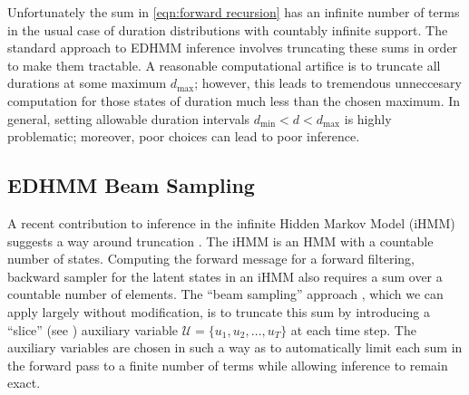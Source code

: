 Unfortunately the sum in \eqref{eqn:forward recursion} has an infinite number of terms in the usual case of  duration distributions with countably infinite support. The standard approach to EDHMM inference involves truncating these sums in order to make them tractable. 
A reasonable computational artifice is to truncate all durations at some maximum $d_\mathrm{max}$; however, this leads to tremendous unneccesary computation for those states of duration much less than the chosen maximum.
In general, setting allowable duration intervals $d_\mathrm{min}<d<d_\mathrm{max}$
is highly problematic; moreover, poor choices can lead to poor inference. 


\subsection{EDHMM Beam Sampling}

A recent contribution to inference 
in 
the infinite Hidden Markov Model (iHMM) \cite{Beal2002} suggests a way around truncation \cite{vanGael2008}.  The iHMM is an HMM with a countable number of states.  Computing the forward message for a forward filtering, backward sampler for the latent states in an iHMM also requires a sum over a countable number of elements.  
The ``beam sampling'' approach  \cite{vanGael2008}, which we can apply largely without modification, is to truncate this sum by introducing a ``slice''  (see \cite{Neal2003}) auxiliary variable $\mathcal{U} = \{u_1, u_2, \ldots,u_T\}$ at each time step.  The auxiliary variables are chosen in such a way as to automatically limit each sum in the forward pass to a finite number of terms while allowing inference to remain exact.%

